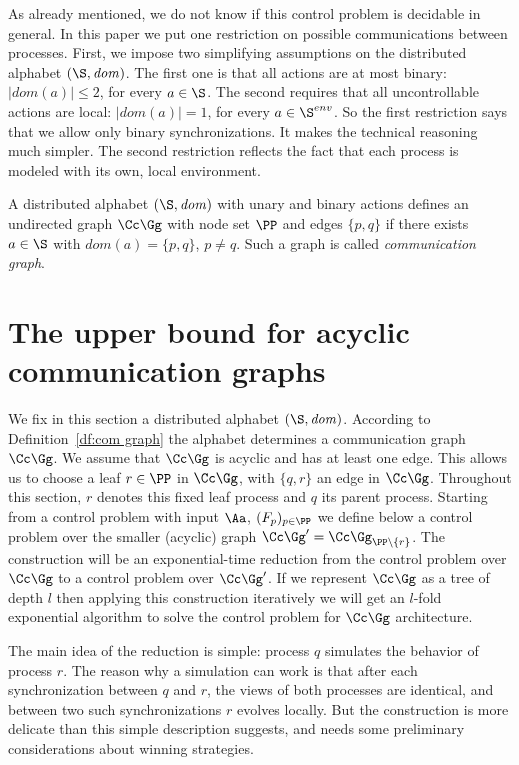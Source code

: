 \documentclass{llncs}
\newcommand{\CG}{\Cc\Gg}
\newcommand{\loc}{\mathit{dom}}
\newcommand{\Senv}{\S^{env}}
\begin{document}
As already mentioned, we do not know if this control problem is
decidable in general. In this paper we put one restriction on possible
communications between processes. First, we impose two
simplifying assumptions on the distributed alphabet $(\S,\loc)$. The 
first one is that all actions are at most binary: $|\loc(a)|\le 2$,
for every $a \in \S$. The second requires that all uncontrollable
actions are local: $|\loc(a)|=1$, for every $a \in
\Senv$. So the first restriction says that we allow only
binary synchronizations. It makes the technical reasoning much
simpler. The second restriction reflects the fact that each process is
modeled with its own, local environment.



\begin{definition}\label{df:com graph}
A distributed alphabet $(\S,\loc)$ with unary and binary actions
defines an undirected graph $\CG$ with node set $\PP$ and edges $\{p,q\}$
if there exists $a \in\S$ with $\loc(a)=\{p,q\}$, $p \not= q$. Such a
graph is called \emph{communication graph}. 
\end{definition}












\section{The upper bound for acyclic communication graphs}

We fix in this section a distributed alphabet
$(\S,\loc)$. According to Definition~\ref{df:com graph} the alphabet
determines a communication graph $\CG$. We assume that $\CG$ is
acyclic and has at least one edge. This allows us to choose a leaf $r
\in \PP$ in $\CG$, with $\{q,r\}$ an edge in $\CG$. Throughout this
section, $r$ denotes this fixed leaf process and $q$ its parent
process. Starting from a
control problem with input $\Aa$, $(F_p)_{p \in\PP}$ we define below a
control problem over the smaller (acyclic) graph $\CG'=\CG_{\PP
  \setminus \{r\}}$. The construction will be an exponential-time
reduction from the control problem over $\CG$ to a control problem
over $\CG'$. If we represent $\CG$ as a tree of depth $l$ then
applying this construction iteratively we will get an $l$-fold
exponential algorithm to solve the control problem for $\CG$
architecture.

The main idea of the reduction is simple: process $q$ simulates
the behavior of process $r$. The reason why a simulation can work is
that after each synchronization between $q$ and $r$, the views of both
processes are identical, and between two such synchronizations $r$
evolves locally. But the construction is more delicate than this
simple description suggests, and needs some preliminary considerations
about winning strategies.
\end{document}

